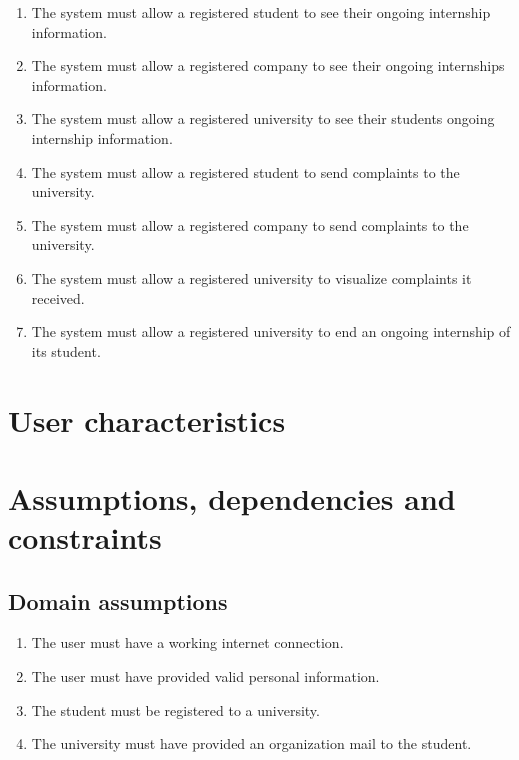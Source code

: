 \begin{enumerate}[label=\textbf{R\arabic* -}]
    \item The system must allow a registered student to see their ongoing internship information.
    \item The system must allow a registered company to see their ongoing internships information.
    \item The system must allow a registered university to see their students ongoing internship information.
    \item The system must allow a registered student to send complaints to the university.
    \item The system must allow a registered company to send complaints to the university.
    \item The system must allow a registered university to visualize complaints it received.
    \item The system must allow a registered university to end an ongoing internship of its student.
\end{enumerate}

\section{User characteristics}

\section{Assumptions, dependencies and constraints}

\subsection{Domain assumptions}

\begin{enumerate}[label=\textbf{D\arabic* -}]
    \item The user must have a working internet connection.
    \item The user must have provided valid personal information.
    \item The student must be registered to a university.
    \item The university must have provided an organization mail to the student.
\end{enumerate}
